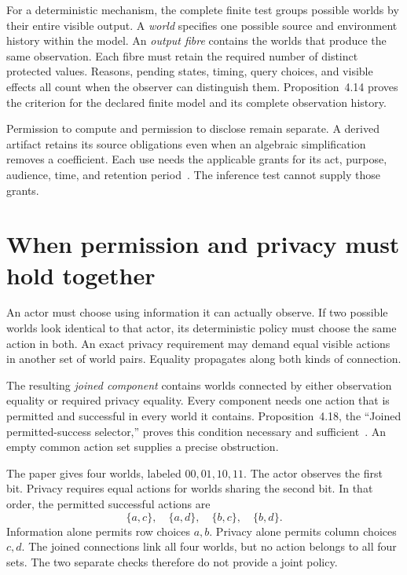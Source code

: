 \documentclass{momentum}
\begin{document}
For a deterministic mechanism, the complete finite test groups possible worlds by their entire visible output.
A \emph{world} specifies one possible source and environment history within the model.
An \emph{output fibre} contains the worlds that produce the same observation.
Each fibre must retain the required number of distinct protected values.
Reasons, pending states, timing, query choices, and visible effects all count when the observer can distinguish them.
Proposition~4.14 proves the criterion for the declared finite model and its complete observation history.

Permission to compute and permission to disclose remain separate.
A derived artifact retains its source obligations even when an algebraic simplification removes a coefficient.
Each use needs the applicable grants for its act, purpose, audience, time, and retention period~\cite[Section~4.10]{sjn}.
The inference test cannot supply those grants.

\section{When permission and privacy must hold together}
\label{sec:joined}

An actor must choose using information it can actually observe.
If two possible worlds look identical to that actor, its deterministic policy must choose the same action in both.
An exact privacy requirement may demand equal visible actions in another set of world pairs.
Equality propagates along both kinds of connection.

The resulting \emph{joined component} contains worlds connected by either observation equality or required privacy equality.
Every component needs one action that is permitted and successful in every world it contains.
Proposition~4.18, the ``Joined permitted-success selector,'' proves this condition necessary and sufficient~\cite[Section~4.11]{sjn}.
An empty common action set supplies a precise obstruction.

The paper gives four worlds, labeled $00,01,10,11$.
The actor observes the first bit.
Privacy requires equal actions for worlds sharing the second bit.
In that order, the permitted successful actions are
\[
 \{a,c\},\quad\{a,d\},\quad\{b,c\},\quad\{b,d\}.
\]
Information alone permits row choices $a,b$.
Privacy alone permits column choices $c,d$.
The joined connections link all four worlds, but no action belongs to all four sets.
The two separate checks therefore do not provide a joint policy.
\end{document}
